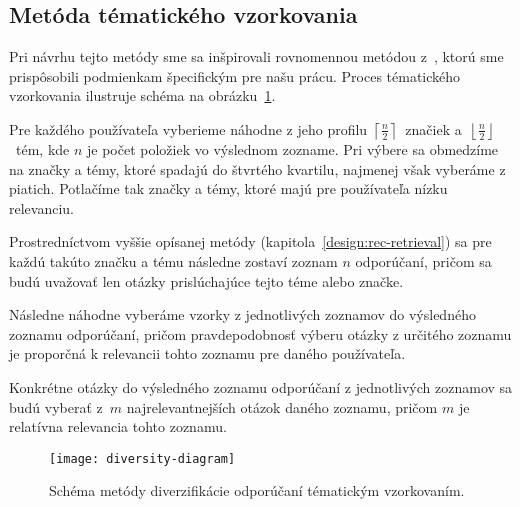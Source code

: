\subsection{Metóda tématického vzorkovania}
\label{sec:thematic-sampling}
Pri návrhu tejto metódy sme sa inšpirovali rovnomennou metódou z~\cite{Szpektor2013}, ktorú sme prispôsobili
podmienkam špecifickým pre našu prácu. Proces tématického vzorkovania ilustruje schéma na obrázku~\ref{fig:tematic-sampling}.
\begin{my_enumerate}
\item{Pre každého používateľa vyberieme náhodne z jeho profilu $\left\lceil\frac{n}{2}\right\rceil$~značiek
    a~$\left\lfloor\frac{n}{2}\right\rfloor$~tém, kde $n$ je počet položiek vo výslednom zozname. Pri výbere sa obmedzíme na značky a témy,
    ktoré spadajú do štvrtého kvartilu, najmenej však vyberáme z piatich. Potlačíme tak značky a témy, ktoré majú pre používateľa nízku relevanciu.}
\item{
    Prostredníctvom vyššie opísanej metódy (kapitola~\ref{design:rec-retrieval}) sa pre každú takúto značku a tému
    následne zostaví zoznam $n$ odporúčaní, pričom sa budú uvažovať len otázky prislúchajúce tejto téme alebo značke.}
\item{
    Následne náhodne vyberáme vzorky z jednotlivých zoznamov do výsledného zoznamu odporúčaní, pričom pravdepodobnosť
    výberu otázky z určitého zoznamu je proporčná k relevancii tohto zoznamu pre daného používateľa.}
\item{
    Konkrétne otázky do výsledného zoznamu odporúčaní z jednotlivých zoznamov sa budú vyberať z~$m$ najrelevantnejších otázok daného zoznamu,
    pričom $m$ je relatívna relevancia tohto zoznamu.}
\end{my_enumerate}

\begin{figure}[H]\begin{center}
\texttt{[image: diversity-diagram]}
\caption{Schéma metódy diverzifikácie odporúčaní tématickým vzorkovaním.\label{fig:tematic-sampling}}\end{center}
\end{figure}
